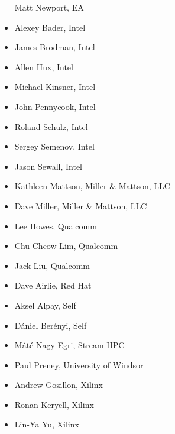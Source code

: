 \begin{multicols}{2}
\begin{itemize}
    Matt Newport, EA
\item
    Alexey Bader, Intel
\item
    James Brodman, Intel
\item
    Allen Hux, Intel
\item
    Michael Kinsner, Intel
\item
    John Pennycook, Intel
\item
    Roland Schulz, Intel
\item
    Sergey Semenov, Intel
\item
    Jason Sewall, Intel
\item
    Kathleen Mattson, Miller \& Mattson, LLC
\item
    Dave Miller, Miller \& Mattson, LLC
\item
    Lee Howes, Qualcomm
\item
    Chu-Cheow Lim, Qualcomm
\item
    Jack Liu, Qualcomm
\item
    Dave Airlie, Red Hat
\item
    Aksel Alpay, Self
\item
    D\'{a}niel Ber\'{e}nyi, Self
\item
    M\'{a}t\'{e} Nagy-Egri, Stream HPC
\item
    Paul Preney, University of Windsor
\item
    Andrew Gozillon, Xilinx
\item
    Ronan Keryell, Xilinx
\item
    Lin-Ya Yu, Xilinx
\end{itemize}
\end{multicols}

